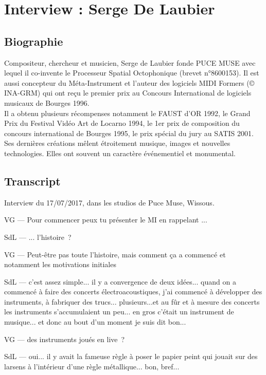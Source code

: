 \chapter{Interview : Serge De Laubier}
\label{appendix:delaubier}
\section*{Biographie}

\noindent Compositeur, chercheur et musicien, Serge de Laubier fonde PUCE MUSE avec lequel il co-invente le Processeur Spatial Octophonique (brevet n°8600153). Il est aussi concepteur du Méta-Instrument et l’auteur des logiciels MIDI Formers (© INA-GRM) qui ont reçu le premier prix au Concours International de logiciels musicaux de Bourges 1996.\\
\indent Il a obtenu plusieurs récompenses notamment le FAUST d’OR 1992, le Grand Prix du Festival Vidéo Art de Locarno 1994, le 1er prix de composition du concours international de Bourges 1995, le prix spécial du jury au SATIS 2001.\\
\indent Ses dernières créations mêlent étroitement musique, images et nouvelles technologies. Elles ont souvent un caractère événementiel et monumental. 


\section*{Transcript}
\noindent Interview du 17/07/2017, dans les studios de Puce Muse, Wissous.

VG — Pour commencer peux tu présenter le MI en rappelant ...

SdL — ... l'histoire ? 

VG — Peut-être pas toute l'histoire, mais comment ça a commencé et notamment les motivations initiales 

SdL — c'est assez simple... il y a convergence de deux idées... quand on a commencé à faire des concerts électroacoustiques, j'ai commencé à développer des instruments, à fabriquer des trucs... plusieurs...et au fûr et à mesure des concerts les instruments s'accumulaient un peu... en gros c'était un instrument de musique... et donc au bout d'un moment je suis dit bon... 

VG — des instruments joués en live ? 

SdL — oui... il y avait la fameuse règle à poser le papier peint qui jouait sur des larsens à l'intérieur d'une règle métallique... bon, bref...  

